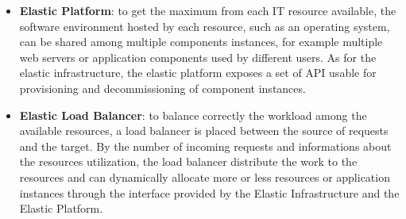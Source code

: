 \begin{itemize}
	\item \textbf{Elastic Platform}: to get the maximum from each IT resource available, the software environment hosted by each resource, such as an operating system, can be shared among multiple components instances, for example multiple web servers or application components used by different users. As for the elastic infrastructure, the elastic platform exposes a set of API usable for provisioning and decommissioning of component instances.
	\item \textbf{Elastic Load Balancer}: to balance correctly the workload among the available resources, a load balancer is placed between the source of requests and the target. By the number of incoming requests and informations about the resources utilization, the load balancer distribute the work to the resources and can dynamically allocate more or less resources or application instances through the interface provided by the Elastic Infrastructure and the Elastic Platform.
\end{itemize}
